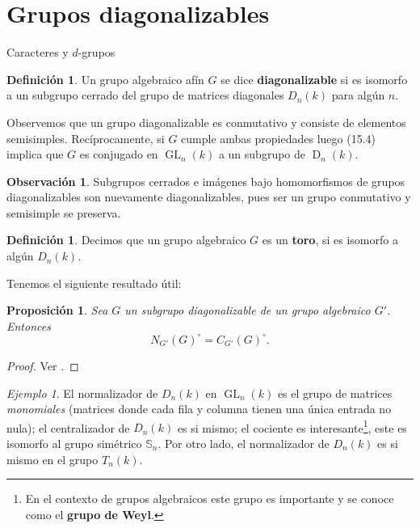 \documentclass[spanish,10pt]{amsart}
\makeatletter
\renewcommand\subsection{\@startsection{subsection}{2}%
  \z@{.5\linespacing\@plus.7\linespacing}{-.5em}%
  {\normalfont\sffamily}}
\newtheorem{proposition}[theorem]{Proposición}
\theoremstyle{definition}
\newtheorem{definition}[theorem]{Definición}
\newtheorem{obs}[theorem]{Observación}
\theoremstyle{remark}
\newtheorem{example}[theorem]{Ejemplo}
\numberwithin{equation}{section}
\makeatother
\begin{document}
\section{Grupos diagonalizables}

\subsection{Caracteres y $d$-grupos}

\begin{definition}
Un grupo algebraico afín $G$ se dice \textbf{diagonalizable} si es isomorfo a un subgrupo cerrado del grupo de matrices diagonales $D_n (k)$ para algún $n$.
\end{definition}
Observemos que un grupo diagonalizable es conmutativo y consiste de elementos semisimples. Recíprocamente, si $G$ cumple ambas propiedades luego (15.4) implica que $G$ es conjugado en $\operatorname{GL}_n (k)$ a un subgrupo de $\operatorname{D}_n (k)$.

\begin{obs}
Subgrupos cerrados e imágenes bajo homomorfismos de grupos diagonalizables son nuevamente diagonalizables, pues ser un grupo conmutativo y semisimple se preserva.
\end{obs}

\begin{definition}
Decimos que un grupo algebraico $G$ es un \textbf{toro}, si es isomorfo a algún $D_n (k)$.
\end{definition}


Tenemos el siguiente resultado útil:

\begin{proposition}\label{proposition:si G es un grupo diagonalizable de un grpo algebraico G' entonces la componente de la identidad de N_G' (G) es la componente de la identidad de C_G' (G)}
Sea $G$ un subgrupo diagonalizable de un grupo algebraico $G'$. Entonces
\[
    N_{G'} (G)^{\circ} = C_{G'} (G)^\circ.
\]
\end{proposition}
\begin{proof}
Ver \cite[Corolario 16.3]{humphreys2012linearAlgebraicGroups}.
\end{proof}

\begin{example}
El normalizador de $D_n (k)$ en $\operatorname{GL}_n (k)$ es el grupo de matrices \textit{monomiales} (matrices donde cada fila y columna tienen una única entrada no nula); el centralizador de $D_n (k)$ es si mismo; el cociente es interesante\footnote{En el contexto de grupos algebraicos este grupo es importante y se conoce como el \textbf{grupo de Weyl}.}, este es isomorfo al grupo simétrico $\mathbb{S}_n$. Por otro lado, el normalizador de $D_n (k)$ es si mismo en el grupo $T_n (k)$.
\end{example}
\end{document}
